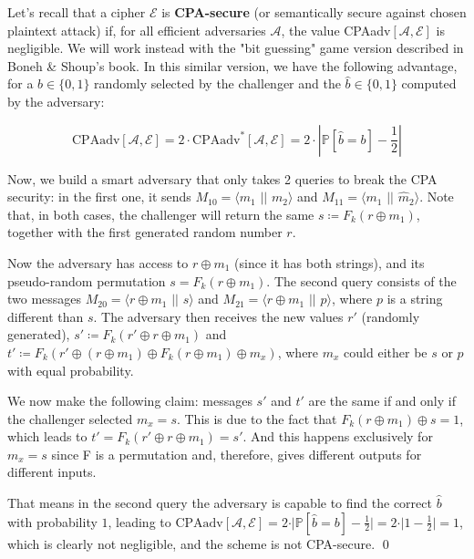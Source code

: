 Let's recall that a cipher $\mathcal{E}$ is \textbf{CPA-secure} (or semantically secure against chosen plaintext attack) if, for all efficient adversaries $\mathcal{A}$, the value CPAadv$[\mathcal{A}, \mathcal{E}]$ is negligible.
We will work instead with the "bit guessing" game version described in Boneh \& Shoup's book. In this similar version, we have the following advantage, for a $b \in \{0, 1\}$ randomly selected by the challenger and the $\hat b \in \{0, 1\}$ computed by the adversary:

\begin{equation*}
    \text{CPAadv}[\mathcal{A}, \mathcal{E}] = 2 \cdot \text{CPAadv}^{*}[\mathcal{A}, \mathcal{E}] = 2 \cdot \left| \mathbb{P}[\hat{b} = b] - \frac{1}{2} \right|
\end{equation*}

Now, we build a smart adversary that only takes 2 queries to break the CPA security: in the first one, it sends $M_{10} = \langle m_1$ $\vert \vert$ $m_2 \rangle$ and $M_{11} = \langle m_1$ $\vert \vert$ $\hat m_2 \rangle$.
Note that, in both cases, the challenger will return the same $s \coloneqq F_k (r \oplus m_1)$, together with the first generated random number $r$.

Now the adversary has access to $r \oplus m_1$ (since it has both strings), and its pseudo-random permutation $s = F_k (r \oplus m_1)$.
The second query consists of the two messages $M_{20} = \langle r \oplus m_1$ $\vert \vert$ $s \rangle$ and $M_{21} = \langle r \oplus m_1$ $\vert \vert$ $p \rangle$, where $p$ is a string different than $s$.
The adversary then receives the new values $r'$ (randomly generated), $s' \coloneqq F_k(r' \oplus r \oplus m_1)$ and $t' \coloneqq F_k(r' \oplus (r \oplus m_1) \oplus F_k (r \oplus m_1) \oplus m_x)$, where $m_x$ could either be $s$ or $p$ with equal probability.

We now make the following claim: messages $s'$ and $t'$ are the same if and only if the challenger selected $m_x = s$.
This is due to the fact that $F_k(r \oplus m_1) \oplus s = 1$, which leads to $t' = F_k(r' \oplus r \oplus m_1) = s'$.
And this happens exclusively for $m_x = s$ since F is a permutation and, therefore, gives different outputs for different inputs.

That means in the second query the adversary is capable to find the correct $\hat b$ with probability $1$, leading to $\text{CPAadv}[\mathcal{A}, \mathcal{E}] = 2 \cdot \vert \mathbb{P}[\hat{b} = b] - \frac{1}{2} \vert = 2 \cdot \vert 1 - \frac{1}{2} \vert = 1$, which is clearly not negligible, and the scheme is not CPA-secure. \hfill \qed

